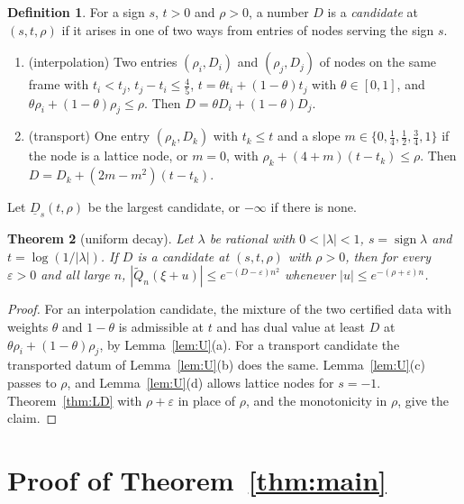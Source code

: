 \documentclass[11pt]{amsart}
\newtheorem{theorem}{Theorem}[section]
\theoremstyle{definition}
\newtheorem{definition}[theorem]{Definition}
\theoremstyle{remark}
\numberwithin{equation}{section}
\newcommand{\Dlow}{\underline{D}}
\begin{document}
\begin{definition}\label{def:Dlow}
For a sign $s$, $t>0$ and $\rho>0$, a number $D$ is a \emph{candidate} at $(s,t,\rho)$ if it arises in one of two ways
from entries of nodes serving the sign $s$.
\begin{enumerate}[label=(\Roman*)]
\item (interpolation) Two entries $(\rho_i,D_i)$ and $(\rho_j,D_j)$ of nodes on the same frame with $t_i<t_j$,
 $t_j-t_i\le\frac45$, $t=\theta t_i+(1-\theta)t_j$ with $\theta\in[0,1]$, and $\theta\rho_i+(1-\theta)\rho_j\le\rho$. Then
 $D=\theta D_i+(1-\theta)D_j$.
\item (transport) One entry $(\rho_k,D_k)$ with $t_k\le t$ and a slope $m\in\{0,\frac14,\frac12,\frac34,1\}$ if the node
 is a lattice node, or $m=0$, with $\rho_k+(4+m)(t-t_k)\le\rho$. Then $D=D_k+(2m-m^2)(t-t_k)$.
\end{enumerate}
Let $\Dlow_s(t,\rho)$ be the largest candidate, or $-\infty$ if there is none.
\end{definition}

\begin{theorem}[uniform decay]\label{thm:U}
Let $\lambda$ be rational with $0<|\lambda|<1$, $s=\operatorname{sign}\lambda$ and $t=\log(1/|\lambda|)$. If $D$ is a
candidate at $(s,t,\rho)$ with $\rho>0$, then for every $\varepsilon>0$ and all large $n$,
$|\tilde Q_n(\xi+u)|\le e^{-(D-\varepsilon)n^2}$ whenever $|u|\le e^{-(\rho+\varepsilon)n}$.
\end{theorem}

\begin{proof}
For an interpolation candidate, the mixture of the two certified data with weights $\theta$ and $1-\theta$ is
admissible at $t$ and has dual value at least $D$ at $\theta\rho_i+(1-\theta)\rho_j$, by Lemma~\ref{lem:U}(a). For a
transport candidate the transported datum of Lemma~\ref{lem:U}(b) does the same. Lemma~\ref{lem:U}(c) passes to $\rho$,
and Lemma~\ref{lem:U}(d) allows lattice nodes for $s=-1$. Theorem~\ref{thm:LD} with $\rho+\varepsilon$ in place of $\rho$,
and the monotonicity in $\rho$, give the claim.
\end{proof}

\section{Proof of Theorem~\ref{thm:main}}\label{sec:proof}
\end{document}
